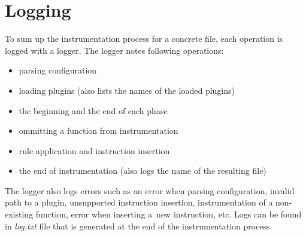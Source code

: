 \section{Logging}

To sum up the instrumentation process for a concrete file, each operation is
logged with a logger. The logger notes following operations:
\begin{itemize}
  \item parsing configuration
  \item loading plugins (also lists the names of the loaded plugins)
  \item the beginning and the end of each phase
  \item ommitting a function from instrumentation
  \item rule application and instruction insertion
  \item the end of instrumentation (also logs the name of the resulting file)
\end{itemize}
The logger also logs errors such as an error when parsing configuration, invalid
path to a plugin, unsupported instruction insertion, instrumentation of a
non-existing function, error when inserting a~new instruction, etc. Logs can be
found in \emph{log.txt} file that is generated at the end of the
instrumentation process.

